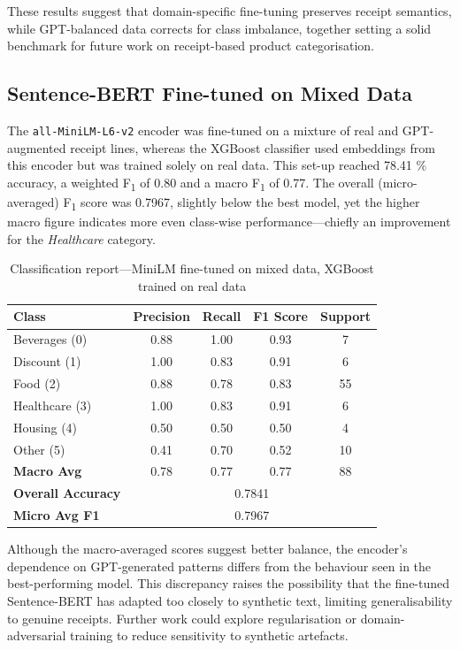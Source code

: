 \documentclass{SGGW-thesis-EN}
\begin{document}
\noindent
These results suggest that domain-specific fine-tuning preserves receipt semantics, while GPT-balanced data corrects
for class imbalance, together setting a solid benchmark for future work on receipt-based product categorisation.

\subsection{Sentence-BERT Fine-tuned on Mixed Data}
The \texttt{all-MiniLM-L6-v2} encoder was fine-tuned on a mixture of real and GPT-augmented receipt lines, whereas the
XGBoost classifier used embeddings from this encoder but was trained solely on real data. This set-up reached
78.41 \% accuracy, a weighted F\textsubscript{1} of 0.80 and a macro F\textsubscript{1} of 0.77. The overall
(micro-averaged) F\textsubscript{1} score was 0.7967, slightly below the best model, yet the higher macro figure
indicates more even class-wise performance—chiefly an improvement for the \emph{Healthcare} category.

\begin{table}[h]
  \centering
  \caption{Classification report—MiniLM fine-tuned on mixed data, XGBoost trained on real data}
  \label{tab:finetuned_st_real_clf_report}
  \begin{tabularx}{\textwidth}{lcccc}
    \toprule
    \textbf{Class} & \textbf{Precision} & \textbf{Recall} & \textbf{F1 Score} & \textbf{Support} \\
    \midrule
    Beverages (0)  & 0.88 & 1.00 & 0.93 & 7  \\
    Discount  (1)  & 1.00 & 0.83 & 0.91 & 6  \\
    Food      (2)  & 0.88 & 0.78 & 0.83 & 55 \\
    Healthcare (3) & 1.00 & 0.83 & 0.91 & 6  \\
    Housing    (4) & 0.50 & 0.50 & 0.50 & 4  \\
    Other      (5) & 0.41 & 0.70 & 0.52 & 10 \\
    \midrule
    \textbf{Macro Avg}        & 0.78 & 0.77 & 0.77 & 88 \\
    \textbf{Overall Accuracy} & \multicolumn{4}{c}{0.7841} \\
    \textbf{Micro Avg F1}     & \multicolumn{4}{c}{0.7967} \\
    \bottomrule
  \end{tabularx}
\end{table}
\noindent Although the macro-averaged scores suggest better balance, the encoder’s dependence on GPT-generated patterns differs
from the behaviour seen in the best-performing model. This discrepancy raises the possibility that the fine-tuned
Sentence-BERT has adapted too closely to synthetic text, limiting generalisability to genuine receipts. Further work
could explore regularisation or domain-adversarial training to reduce sensitivity to synthetic artefacts.
\end{document}
